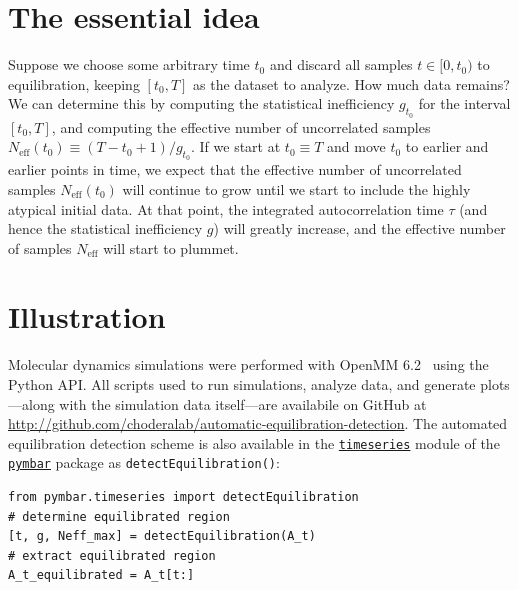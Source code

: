 \documentclass[aps,pre,twocolumn,nofootinbib,superscriptaddress,linenumbers,11point]{revtex4-1}
\begin{document}
\section*{The essential idea}
\label{section:the-idea}

Suppose we choose some arbitrary time $t_0$ and discard all samples $t \in [0, t_0)$ to equilibration, keeping $[t_0, T]$ as the dataset to analyze.
How much data remains?
We can determine this by computing the statistical inefficiency $g_{t_0}$ for the interval $[t_0, T]$, and computing the effective number of uncorrelated samples $N_\mathrm{eff}(t_0) \equiv (T - t_0 + 1) / g_{t_0}$.
If we start at $t_0 \equiv T$ and move $t_0$ to earlier and earlier points in time, we expect that the effective number of uncorrelated samples $N_\mathrm{eff}(t_0)$ will continue to grow until we start to include the highly atypical initial data.
At that point, the integrated autocorrelation time $\tau$ (and hence the statistical inefficiency $g$) will greatly increase, and the effective number of samples $N_\mathrm{eff}$ will start to plummet.



\section*{Illustration}
\label{section:methods}

Molecular dynamics simulations were performed with OpenMM 6.2~\cite{eastman:jctc:2012:openmm} using the Python API.
All scripts used to run simulations, analyze data, and generate plots---along with the simulation data itself---are availabile on GitHub at \url{http://github.com/choderalab/automatic-equilibration-detection}.
The automated equilibration detection scheme is also available in the \href{http://pymbar.readthedocs.org/en/latest/timeseries.html}{\tt timeseries} module of the \href{http://github.com/choderalab/pymbar}{\tt pymbar} package as {\tt detectEquilibration()}:
\begin{verbatim}
from pymbar.timeseries import detectEquilibration
# determine equilibrated region
[t, g, Neff_max] = detectEquilibration(A_t)
# extract equilibrated region
A_t_equilibrated = A_t[t:]
\end{verbatim}
\end{document}
